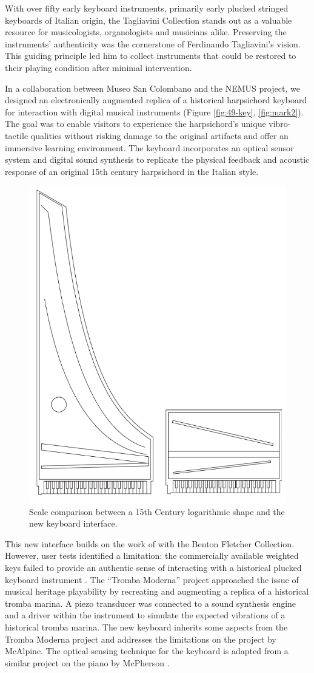 With over fifty early keyboard instruments, primarily early plucked stringed keyboards of Italian origin, the Tagliavini Collection stands out as a valuable resource for musicologists, organologists and musicians alike. Preserving the instruments' authenticity was the cornerstone of Ferdinando Tagliavini’s vision. This guiding principle led him to collect instruments that could be restored to their playing condition after minimal intervention. 

In a collaboration between Museo San Colombano and the NEMUS project, we designed an electronically augmented replica of a historical harpsichord keyboard for interaction with digital musical instruments (Figure \ref{fig:49-key}, \ref{fig:mark2}). The goal was to enable visitors to experience the harpsichord’s unique vibro-tactile qualities without risking damage to the original artifacts and offer an immersive learning environment. The keyboard incorporates an optical sensor system and digital sound synthesis to replicate the physical feedback and acoustic response of an original 15th century harpsichord in the Italian style.

\begin{figure}
    \centering
    \includegraphics[width=0.5\linewidth]{img/outline-compare.png}
    \caption{Scale comparison between a 15th Century logarithmic shape and the new keyboard interface.}
    \label{fig:log-harp-comp}
\end{figure}

This new interface builds on the work of \textcite{mcalpine_sampling_2014} with the Benton Fletcher Collection. However, user tests identified a limitation: the commercially available weighted keys failed to provide an authentic sense of interacting with a historical plucked keyboard instrument \cite{mcalpine_sampling_2014}. The ``Tromba Moderna'' project \cite{baldwin_tromba_2016} approached the issue of musical heritage playability by recreating and augmenting a replica of a historical tromba marina. A piezo transducer was connected to a sound synthesis engine and a driver within the instrument to simulate the expected vibrations of a historical tromba marina. The new keyboard inherits some aspects from the Tromba Moderna project and addresses the limitations on the project by McAlpine. The optical sensing technique for the keyboard is adapted from a similar project on the piano by McPherson \cite{mcpherson_portable_2013}.

